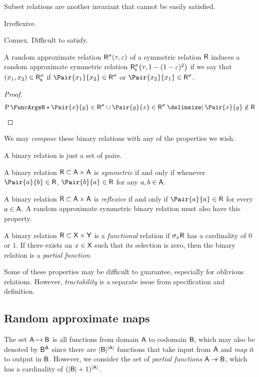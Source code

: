 \documentclass[11pt,final,hidelinks]{article}
\begin{document}
Subset relations are another invariant that cannot be easily satisfied.


Irreflexive.

Connex. Difficult to satisfy.


\begin{theorem}
	A random approximate relation $\ARelation{R}(\tprate,\fprate)$ of a symmetric relation $\Relation{R}$ induces a random approximate symmetric relation $\ARelation{R}[s]\!\left(\tprate,1-(1-\fprate)^2\right)$ if we say that $(x_1,x_2) \in \ARelation{R}[s]$ if $\Pair{x_1}{x_2} \in \ARelation{R}$ or $\Pair{x_2}{x_1} \in \ARelation{R}$.
\end{theorem}
\begin{proof}
	\begin{equation}
	\Prob{\Pair{x}{y} \in \ARelation{R} \SetUnion \Pair{y}{x} \in \ARelation{R} \Given \Pair{x}{y} \notin \Relation{R}}
	\end{equation}
\end{proof}

We may \emph{compose} these binary relations with any of the properties we wish.






A binary relation is just a set of pairs.


A binary relation $\Relation{R} \subset \Set{A} \times \Set{A}$ is \emph{symmetric} if and only if whenever $\Pair{a}{b} \in \Relation{R}$, $\Pair{b}{a} \in \Relation{R}$ for any $a,b \in \Set{A}$.


A binary relation $\Relation{R} \subset \Set{A} \times \Set{A}$ is \emph{reflexive} if and only if $\Pair{a}{a} \in \Relation{R}$ for every $a \in \Set{A}$.
A random approximate symmetric binary relation must also have this property.


% 
A binary relation $\Relation{R} \subset \Set{X} \times \Set{Y}$ is a \emph{functional} relation if $\Selection_{x} \Set{R}$ has a cardinality of $0$ or $1$. If there exists an $x \in \Set{X}$ such that its selection is zero, then the binary relation is a \emph{partial function}.



\begin{remark}
Some of these properties may be difficult to guarantee, especially for oblivious relations.
However, \emph{tractability} is a separate issue from specification and definition.
\end{remark}

\subsection{Random approximate maps}
\label{sec:map}
The set $\Set{A} \mapsto \Set{B}$ is all functions from domain $\Set{A}$ to codomain $\Set{B}$, which may also be denoted by $\Set{B}^{\Set{A}}$ since there are $\Card{\Set{B}}^{\Card{\Set{A}}}$ functions that take input from $\Set{A}$ and \emph{map} it to output in $\Set{B}$.
However, we consider the set of \emph{partial functions} $\Set{A} \pfun \Set{B}$, which has a cardinality of $(\Card{\Set{B}}+1)^{\Card{\Set{A}}}$.
\end{document}
